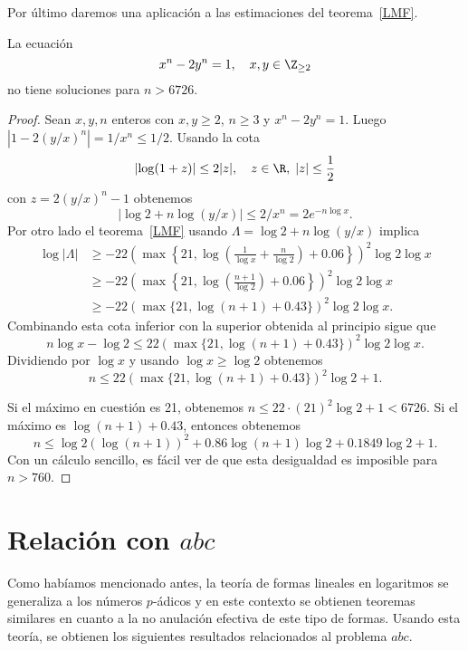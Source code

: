 \documentclass[11pt, reqno]{amsart}
\begin{document}
Por último daremos una aplicación a las estimaciones del teorema~\ref{LMF}.
\begin{prop}
	La ecuación $$x^n-2y^n=1,\quad x,y\in \Z_{\geq 2}$$ no tiene soluciones para $n>6726$.
\end{prop}
\begin{proof}
	Sean $x,y,n$ enteros con $x,y\geq 2$, $n\geq 3$ y $x^n-2y^n=1$. Luego $|1-2(y/x)^n|=1/x^n\leq 1/2$.
	Usando la cota
	\[
		\lvert\log(1+z)\rvert \leq 2|z|, \quad z\in \R,\; |z|\leq \frac{1}{2}
	\]
	con $z=2(y/x)^n-1$ obtenemos
	\[
		\lvert\log 2+n\log(y/x)\rvert \leq 2/x^n=2e^{-n\log x}.
	\]
	Por otro lado el teorema~\ref{LMF} usando $\Lambda=\log 2+n\log(y/x)$ implica
	\begin{align*}
		\log |\Lambda|&\geq -22\left( \max\mathopen{}\left\{ 21, \log\mathopen{}\left( \frac{1}{\log x}+\frac{n}{\log 2} \right)\mathclose{}+0.06\right\}\mathclose{} \right)^2
		\log 2\log x\\
			      &\geq -22\left( \max\mathopen{}\left\{ 21, \log\mathopen{}\left( \frac{n+1}{\log 2} \right)\mathclose{}+0.06 \right\}\mathclose{} \right)^2\log 2\log x\\
			      &\geq -22( \max\{ 21, \log(n+1)+0.43 \} )^2\log 2\log x.
	\end{align*}
	Combinando esta cota inferior con la superior obtenida al principio sigue que
	\[
		n\log x-\log 2\leq 22( \max\{ 21, \log(n+1)+0.43 \} )^2\log 2\log x.
	\]
	Dividiendo por $\log x$ y usando $\log x\geq \log 2$ obtenemos
	\[
		n\leq 22( \max\{ 21, \log(n+1)+0.43 \} )^2\log 2+1.
	\]

	Si el máximo en cuestión es 21, obtenemos $n\leq 22\cdot(21)^2\log 2 +1<6726$.
	Si el máximo es $\log(n+1)+0.43$, entonces obtenemos
	\[
		n\leq \log 2(\log(n+1))^2+0.86\log(n+1)\log 2+0.1849\log 2+1.
	\]
	Con un cálculo sencillo, es fácil ver de que esta desigualdad es imposible para $n>760$. 
\end{proof}

\section{Relación con $abc$}

Como habíamos mencionado antes, la teoría de formas lineales en logaritmos se generaliza a los números $p$-ádicos y en este contexto se obtienen teoremas similares en cuanto a la no anulación efectiva de este tipo de formas. Usando esta teoría, se obtienen los siguientes resultados relacionados al problema $abc$.
\end{document}
